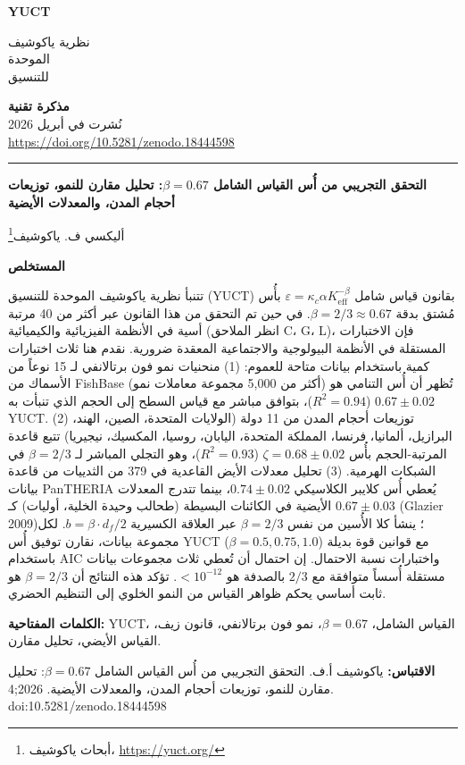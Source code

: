 \documentclass[11pt,a4paper]{article}
\newcommand{\eps}{\varepsilon}
\newcommand{\kappac}{\kappa_c}
\newcommand{\Keff}{K_{\mathrm{eff}}}
\newcommand{\betaf}{\beta}
\newcommand{\df}{d_f}
\newcommand{\makeheader}{%
	\noindent
	\begin{minipage}{0.17\textwidth}
		\raggedright
		{\sffamily\bfseries\color{skyblue}\fontsize{46}{46}\selectfont YUCT}%
	\end{minipage}%
	\hspace{30pt}
	\begin{minipage}{0.32\textwidth}
		\raggedright
		{\sffamily\fontsize{11}{13}\selectfont نظرية ياكوشيف\\ الموحدة\\ للتنسيق}%
	\end{minipage}%
	\hfill
	\begin{minipage}{0.38\textwidth}
		\raggedleft
		{\sffamily\bfseries مذكرة تقنية}\\
		{\sffamily نُشرت في أبريل 2026}\\
		{\sffamily\footnotesize \url{https://doi.org/10.5281/zenodo.18444598}}%
	\end{minipage}
	\par\vspace{5pt}
	\noindent\textcolor{gold}{\rule{\textwidth}{1.6pt}}
	\par\vspace{0pt}
}
\begin{document}
	\thispagestyle{firstpage}
	\makeheader
	
	\vspace{0cm}
	{\LARGE\bfseries التحقق التجريبي من أُس القياس الشامل \(\beta = 0.67\): تحليل مقارن للنمو، توزيعات أحجام المدن، والمعدلات الأيضية \par}
	\vspace{0.2cm}
	
	{\large أليكسي ف. ياكوشيف\footnote{أبحاث ياكوشيف، \url{https://yuct.org/}}} \\
	\vspace{0.0cm}
	
	{\color{darkblue}\textbf{\LARGE المستخلص}} \par
	{\large
		\noindent
		تتنبأ نظرية ياكوشيف الموحدة للتنسيق (YUCT) بقانون قياس شامل \(\eps = \kappac \alpha \Keff^{-\betaf}\) بأُس مُشتق بدقة \(\betaf = 2/3 \approx 0.67\). في حين تم التحقق من هذا القانون عبر أكثر من 40 مرتبة أسية في الأنظمة الفيزيائية والكيميائية (انظر الملاحق C، G، L)، فإن الاختبارات المستقلة في الأنظمة البيولوجية والاجتماعية المعقدة ضرورية. نقدم هنا ثلاث اختبارات كمية باستخدام بيانات متاحة للعموم: (1) منحنيات نمو فون برتالانفي لـ 15 نوعاً من الأسماك من FishBase (أكثر من 5,000 مجموعة معاملات نمو) تُظهر أن أُس التنامي هو \(0.67 \pm 0.02\) (\(R^2=0.94\))، بتوافق مباشر مع قياس السطح إلى الحجم الذي تنبأت به YUCT. (2) توزيعات أحجام المدن من 11 دولة (الولايات المتحدة، الصين، الهند، البرازيل، ألمانيا، فرنسا، المملكة المتحدة، اليابان، روسيا، المكسيك، نيجيريا) تتبع قاعدة المرتبة-الحجم بأُس \(\zeta = 0.68 \pm 0.02\) (\(R^2=0.93\))، وهو التجلي المباشر لـ \(\beta = 2/3\) في الشبكات الهرمية. (3) تحليل معدلات الأيض القاعدية في 379 من الثدييات من قاعدة بيانات PanTHERIA يُعطي أُس كلايبر الكلاسيكي \(0.74 \pm 0.02\)، بينما تتدرج المعدلات الأيضية في الكائنات البسيطة (طحالب وحيدة الخلية، أوليات) كـ \(0.67 \pm 0.03\) (Glazier 2009)؛ ينشأ كلا الأُسين من نفس \(\betaf = 2/3\) عبر العلاقة الكسيرية \(b = \betaf \cdot \df/2\). لكل مجموعة بيانات، نقارن توفيق أُس YUCT مع قوانين قوة بديلة (\(\beta = 0.5, 0.75, 1.0\)) باستخدام AIC واختبارات نسبة الاحتمال. إن احتمال أن تُعطي ثلاث مجموعات بيانات مستقلة أُسساً متوافقة مع \(2/3\) بالصدفة هو \(< 10^{-12}\). تؤكد هذه النتائج أن \(\betaf = 2/3\) هو ثابت أساسي يحكم ظواهر القياس من النمو الخلوي إلى التنظيم الحضري.}
	
	\vspace{0.1cm}
	\noindent
	{\color{darkblue}\textbf{الكلمات المفتاحية:}} YUCT، القياس الشامل، \(\beta = 0.67\)، نمو فون برتالانفي، قانون زيف، القياس الأيضي، تحليل مقارن.
	
	\vspace{0.1cm}
	\noindent
	{\color{darkblue}\textbf{الاقتباس:}} ياكوشيف أ.ف. التحقق التجريبي من أُس القياس الشامل \(\beta = 0.67\): تحليل مقارن للنمو، توزيعات أحجام المدن، والمعدلات الأيضية. 2026;4. doi:10.5281/zenodo.18444598
	
\end{document}
